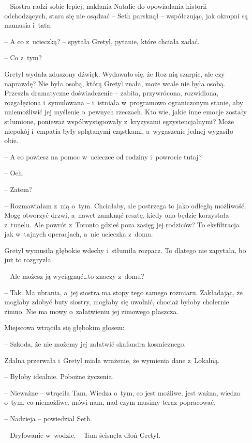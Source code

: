 \documentclass[oneside,polish,11pt,sfheadings]{mwbk}
\begin{document}
-- Siostra radzi sobie lepiej, nakłania Natalie do opowiadania historii
odchodzących, stara się nie osądzać -- Seth parsknął -- współczując, jak
okropni są mamusia i~tata.

-- A co z~ucieczką? -- spytała Gretyl, pytanie, które chciała zadać.

-- Co z~tym?

Gretyl wydała zduszony dźwięk. Wydawało się, że Roz nią szarpie, ale czy
naprawdę? Nie była osobą, którą Gretyl znała, może wcale nie była osobą.
Przeszła dramatyczne doświadczenie -- zabita, przywrócona, rozwidlona,
rozgałęziona i~symulowana -- i~istniała w~programowo ograniczonym stanie,
aby uniemożliwić jej myślenie o~pewnych rzeczach. Kto wie, jakie inne
emocje zostały stłumione, ponieważ współwystępowały z~kryzysami
egzystencjalnymi? Może niepokój i~empatia były splątanymi cząstkami, a~wygaszenie jednej wygasiło obie.

-- A co powiesz na pomoc w~ucieczce od rodziny i~powrocie tutaj?

-- Och.

-- Zatem?

-- Rozmawiałam z~nią o~tym. Chciałaby, ale postrzega to jako odległą
możliwość. Mogę otworzyć drzwi, a~nawet zamknąć resztę, kiedy ona będzie
korzystała z~tunelu. Ale powrót z~Toronto gdzieś poza zasięg jej
rodziców? To eksfiltracja jak w~tajnych operacjach, a~nie ucieczka z~domu.

Gretyl wymusiła głębokie wdechy i~stłumiła rozpacz. To dlatego nie
zapytała, bo już to rozgryzła.

-- Ale możesz ją wyciągnąć\ldots  to znaczy z~domu?

-- Tak. Ma ubrania, a~jej siostra ma stopy tego samego rozmiaru.
Zakładając, że mogłaby zdobyć buty siostry, mogłaby się uwolnić, chociaż
byłoby cholernie zimno. Nie ma mowy o~załatwieniu jej zimowego płaszcza.

Miejscowa wtrąciła się głębokim głosem: 

-- Szkoda, że nie możemy jej
załatwić skafandra kosmicznego.

Zdalna przerwała i~Gretyl miała wrażenie, że wymienia dane z~Lokalną. 

-- Byłoby idealnie. Pobożne życzenia.

-- Nieważne -- wtrąciła Tam. Wiedza o~tym, co jest możliwe, jest ważna,
wiedza o~tym, co niemożliwe, mówi nam, nad czym musimy teraz popracować.

-- Nadzieja -- powiedział Seth.

-- Dryfowanie w~wodzie. -- Tam ścisnęła dłoń Gretyl.
\end{document}
